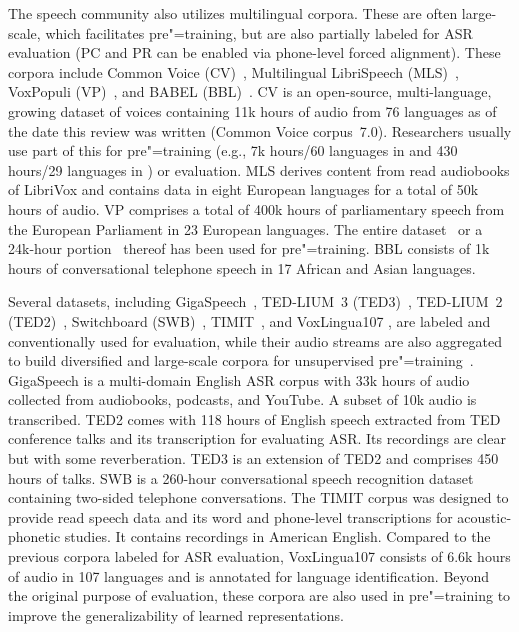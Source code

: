 The speech community also utilizes multilingual corpora. These are often
large-scale, which facilitates pre"=training, but are also partially labeled for ASR
evaluation (PC and PR can be enabled via phone-level forced alignment). These
corpora include Common Voice (CV)~\parencite{ardila_common_2020}, Multilingual
LibriSpeech (MLS)~\parencite{pratap_mls_2020}, VoxPopuli 
(VP)~\parencite{wang_voxpopuli_2021}, and BABEL (BBL)~\parencite{gales_speech_2014}. CV is
an open-source, multi-language, growing dataset of voices containing 11k hours
of audio from 76 languages as of the date this review was written (Common Voice
corpus~7.0). Researchers usually use part of this for pre"=training (e.g., 7k
hours/60 languages in \parencite{babu_xlsr_2021} and 430 hours/29 languages in
\parencite{kawakami_learning_2020}) or evaluation. 
MLS derives content from read audiobooks of LibriVox and contains data in eight
European languages for a total of 50k hours of audio. VP comprises a total of 400k
hours of parliamentary speech from the European Parliament in 23 European
languages.
The entire dataset~\parencite{babu_xlsr_2021} or a 24k-hour 
portion~\parencite{chen_unispeechsat_2021, chen_wavlm_2021} thereof has been used for pre"=training. BBL
consists of 1k hours of conversational telephone speech in 17 African and Asian
languages.

Several datasets, including GigaSpeech~\parencite{chen_gigaspeech_2021}, TED-LIUM~3
(TED3)~\parencite{hernandez_tedlium_2018}, TED-LIUM~2 (TED2)~\parencite{rousseau_tedlium_2012},
Switchboard (SWB)~\parencite{godfrey_switchboard_1992}, 
TIMIT~\parencite{garofolo_timit_1993}, and VoxLingua107 \parencite{valk_voxlingua107_2021}, are
labeled and conventionally used for evaluation, while their audio streams are
also aggregated to build diversified and large-scale corpora for unsupervised
pre"=training~\parencite{kawakami_learning_2020, song_speechxlnet_2020, babu_xlsr_2021}.
GigaSpeech is a multi-domain English ASR corpus with 33k hours of audio
collected from audiobooks, podcasts, and YouTube. A subset of 10k audio is
transcribed. TED2 comes with 118 hours of English speech extracted from
TED conference talks and its transcription for evaluating ASR. Its recordings
are clear but with some reverberation. TED3 is an extension of TED2 and
comprises 450 hours of talks. SWB is a 260-hour conversational speech
recognition dataset containing two-sided telephone conversations.
The TIMIT corpus was designed to provide read speech data and its word and
phone-level transcriptions for acoustic-phonetic studies. It contains recordings
in American English. Compared to the previous corpora labeled for ASR
evaluation, VoxLingua107 consists of 6.6k hours of audio in 107 languages and
is annotated for language identification. Beyond the original purpose of
evaluation, these corpora are also used in pre"=training to improve the
generalizability of learned representations.


